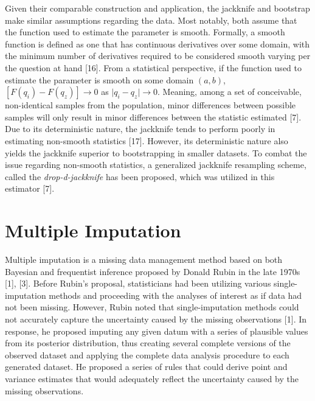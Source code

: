 \documentclass[
  letterpaper,
  DIV=11,
  numbers=noendperiod]{scrreprt}
\begin{document}
Given their comparable construction and application, the jackknife and
bootstrap make similar assumptions regarding the data. Most notably,
both assume that the function used to estimate the parameter is smooth.
Formally, a smooth function is defined as one that has continuous
derivatives over some domain, with the minimum number of derivatives
required to be considered smooth varying per the question at hand
{[}16{]}. From a statistical perspective, if the function used to
estimate the parameter is smooth on some domain \((a, b)\),
\([F(q_i) - F(q_z)] \rightarrow 0\) as
\(\lvert q_i - q_z\rvert \rightarrow 0\). Meaning, among a set of
conceivable, non-identical samples from the population, minor
differences between possible samples will only result in minor
differences between the statistic estimated {[}7{]}. Due to its
deterministic nature, the jackknife tends to perform poorly in
estimating non-smooth statistics {[}17{]}. However, its deterministic
nature also yields the jackknife superior to bootstrapping in smaller
datasets. To combat the issue regarding non-smooth statistics, a
generalized jackknife resampling scheme, called the
\emph{drop-d-jackknife} has been proposed, which was utilized in this
estimator {[}7{]}.

\hypertarget{multiple-imputation}{%
\section{Multiple Imputation}\label{multiple-imputation}}

Multiple imputation is a missing data management method based on both
Bayesian and frequentist inference proposed by Donald Rubin in the late
1970s {[}1{]}, {[}3{]}. Before Rubin's proposal, statisticians had been
utilizing various single-imputation methods and proceeding with the
analyses of interest as if data had not been missing. However, Rubin
noted that single-imputation methods could not accurately capture the
uncertainty caused by the missing observations {[}1{]}. In response, he
proposed imputing any given datum with a series of plausible values from
its posterior distribution, thus creating several complete versions of
the observed dataset and applying the complete data analysis procedure
to each generated dataset. He proposed a series of rules that could
derive point and variance estimates that would adequately reflect the
uncertainty caused by the missing observations.
\end{document}
